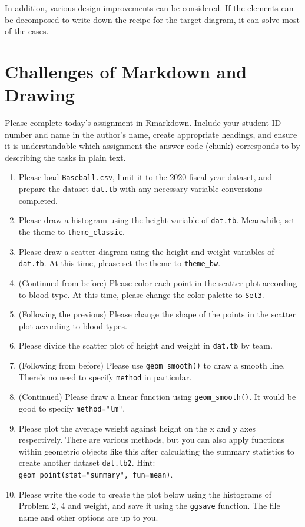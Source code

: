 \documentclass[
  a4paper,
]{book}
\providecommand{\tightlist}{%
  \setlength{\itemsep}{0pt}\setlength{\parskip}{0pt}}\usepackage{longtable,booktabs,array}
\begin{document}
In addition, various design improvements can be considered. If the
elements can be decomposed to write down the recipe for the target
diagram, it can solve most of the cases.

\section{Challenges of Markdown and
Drawing}\label{challenges-of-markdown-and-drawing}

Please complete today's assignment in Rmarkdown. Include your student ID
number and name in the author's name, create appropriate headings, and
ensure it is understandable which assignment the answer code (chunk)
corresponds to by describing the tasks in plain text.

\begin{enumerate}
\def\labelenumi{\arabic{enumi}.}
\tightlist
\item
  Please load \texttt{Baseball.csv}, limit it to the 2020 fiscal year
  dataset, and prepare the dataset \texttt{dat.tb} with any necessary
  variable conversions completed.
\item
  Please draw a histogram using the height variable of \texttt{dat.tb}.
  Meanwhile, set the theme to \texttt{theme\_classic}.
\item
  Please draw a scatter diagram using the height and weight variables of
  \texttt{dat.tb}. At this time, please set the theme to
  \texttt{theme\_bw}.
\item
  (Continued from before) Please color each point in the scatter plot
  according to blood type. At this time, please change the color palette
  to \texttt{Set3}.
\item
  (Following the previous) Please change the shape of the points in the
  scatter plot according to blood types.
\item
  Please divide the scatter plot of height and weight in \texttt{dat.tb}
  by team.
\item
  (Following from before) Please use \texttt{geom\_smooth()} to draw a
  smooth line. There's no need to specify \texttt{method} in particular.
\item
  (Continued) Please draw a linear function using
  \texttt{geom\_smooth()}. It would be good to specify
  \texttt{method="lm"}.
\item
  Please plot the average weight against height on the x and y axes
  respectively. There are various methods, but you can also apply
  functions within geometric objects like this after calculating the
  summary statistics to create another dataset \texttt{dat.tb2}. Hint:
  \texttt{geom\_point(stat="summary",\ fun=mean)}.
\item
  Please write the code to create the plot below using the histograms of
  Problem 2, 4 and weight, and save it using the \texttt{ggsave}
  function. The file name and other options are up to you.
\end{enumerate}
\end{document}
